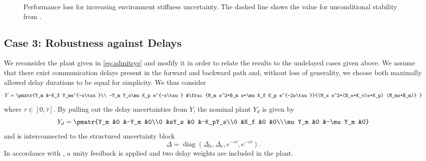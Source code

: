 \begin{figure}\centering%
\caption{Performance loss for increasing environment stiffness uncertainty. 
The dashed line shows the value for unconditional stability from .
}%
\label{fig:increasingKe}%
\end{figure}


\subsection{Case 3: Robustness against Delays}\label{sec:numcase3}

We reconsider the plant given in \eqref{eq:admitsys} and modify it in order to relate
the results to the undelayed cases given above. We assume that there exist communication 
delays present in the forward and backward path and, without loss of generality, we 
choose both maximally allowed delay durations to be equal for simplicity. We thus consider
\[
Y= \pmatr{%
Y_m  &-K_f Y_me^{-s\tau}\\ -Y_m Y_s\mu K_p e^{-s\tau} 
&\frac{M_m s^2+B_m s+\mu K_f K_p e^{-2s\tau}}{(M_s s^2+(B_s+K_v)s+K_p) (M_ms+B_m)}
}
\]
where $\tau\in[0,\bar{\tau}]$. By pulling out the delay uncertainties from $Y$, the nominal plant $Y_d$ is given by
\[
\arraycolsep0.2ex
Y_d  = \pmatr{Y_m &0 &-Y_m &0\\0 &sY_s &0 &-K_pY_s\\0 &K_f &0 &0\\\mu Y_m &0 &-\mu Y_m &0}
\]
and is interconnected to the structured uncertainty block
\[
\Delta = \operatorname{diag}\left(\Delta_h,\Delta_e,e^{-s\tau},e^{-s\tau}\right).
\]
In accordance with , a unity feedback is applied and 
two delay weights are included in the plant. 

